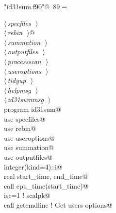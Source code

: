 \documentclass[10pt,a4paper,notitlepage]{article}
\begin{document}
\begin{flushleft} \small
\begin{minipage}{\linewidth}\label{scrap112}\raggedright\small
{} \verb@"id31sum.f90"@\nobreak\ {\footnotesize {89}}$\equiv$
\vspace{-1ex}
\begin{list}{}{} \item
\mbox{}\verb@@\hbox{$\langle\,${\it specfiles}\nobreak\ {\footnotesize {}}$\,\rangle$}\verb@@\\
\mbox{}\verb@@\hbox{$\langle\,${\it rebin}\nobreak\ {\footnotesize {}}$\,\rangle$}\verb@ @\\
\mbox{}\verb@@\hbox{$\langle\,${\it summation}\nobreak\ {\footnotesize {}}$\,\rangle$}\verb@@\\
\mbox{}\verb@@\hbox{$\langle\,${\it outputfiles}\nobreak\ {\footnotesize {}}$\,\rangle$}\verb@@\\
\mbox{}\verb@@\hbox{$\langle\,${\it processscan}\nobreak\ {\footnotesize {}}$\,\rangle$}\verb@@\\
\mbox{}\verb@@\hbox{$\langle\,${\it useroptions}\nobreak\ {\footnotesize {}}$\,\rangle$}\verb@@\\
\mbox{}\verb@@\hbox{$\langle\,${\it tidyup}\nobreak\ {\footnotesize {}}$\,\rangle$}\verb@@\\
\mbox{}\verb@@\hbox{$\langle\,${\it helpmsg}\nobreak\ {\footnotesize {}}$\,\rangle$}\verb@@\\
\mbox{}\verb@@\hbox{$\langle\,${\it id31summsg}\nobreak\ {\footnotesize {}}$\,\rangle$}\verb@@\\
\mbox{}\verb@      program id31sum@\\
\mbox{}\verb@      use specfiles@\\
\mbox{}\verb@      use rebin@\\
\mbox{}\verb@      use useroptions@\\
\mbox{}\verb@      use summation@\\
\mbox{}\verb@      use outputfiles@\\
\mbox{}\verb@      integer(kind=4)::i@\\
\mbox{}\verb@      real start_time, end_time@\\
\mbox{}\verb@      call cpu_time(start_time)@\\
\mbox{}\verb@      isc=1 ! scalpk@\\
\mbox{}\verb@      call getcmdline                                 ! Get users options@\\

\end{list}
\end{minipage}
\end{flushleft}
\end{document}
